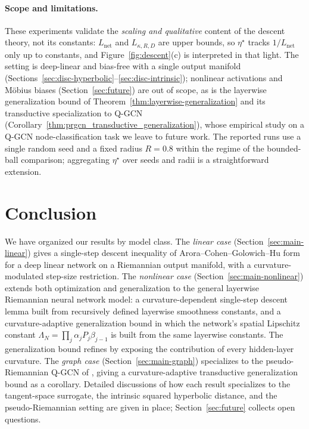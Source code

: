 \documentclass[letterpaper]{article}
\begin{document}
\paragraph{Scope and limitations.}
These experiments validate the \emph{scaling and qualitative} content of
the descent theory, not its constants: $L_{\mathrm{net}}$ and
$L_{\kappa,R,D}$ are upper bounds, so $\eta^\star$ tracks $1/L_{\mathrm{net}}$
only up to constants, and Figure~\ref{fig:descent}(c) is interpreted in that
light. The setting is deep-linear and bias-free with a single output
manifold (Sections~\ref{sec:disc-hyperbolic}--\ref{sec:disc-intrinsic});
nonlinear activations and M\"obius biases (Section~\ref{sec:future})
are out of scope, as is the layerwise generalization bound of
Theorem~\ref{thm:layerwise-generalization} and its transductive
specialization to Q-GCN
(Corollary~\ref{thm:prgcn_transductive_generalization}), whose empirical
study on a Q-GCN node-classification task we leave to future work.
The reported runs use a single random seed and a fixed radius $R=0.8$
within the regime of the bounded-ball comparison; aggregating $\eta^\star$
over seeds and radii is a straightforward extension.

\section{Conclusion}
\label{sec:conclusion}

We have organized our results by model class. The \emph{linear case}
(Section~\ref{sec:main-linear}) gives a single-step descent inequality of
Arora--Cohen--Golowich--Hu form for a deep linear network on a Riemannian
output manifold, with a curvature-modulated step-size restriction. The
\emph{nonlinear case} (Section~\ref{sec:main-nonlinear}) extends both
optimization and generalization to the general layerwise Riemannian
neural network model: a curvature-dependent single-step descent lemma
built from recursively defined layerwise smoothness constants, and a
curvature-adaptive generalization bound in which the network's spatial
Lipschitz constant
$\Lambda_N = \prod_j \alpha_j P_j \beta_{j-1}$ is built from the same
layerwise constants. The generalization bound refines
\cite{sarkar2025learning} by exposing the contribution of every
hidden-layer curvature. The \emph{graph case} (Section~\ref{sec:main-graph})
specializes to the pseudo-Riemannian Q-GCN of \cite{xiong2022pseudo},
giving a curvature-adaptive transductive generalization bound as a
corollary. Detailed discussions of how each result specializes to the
tangent-space surrogate, the intrinsic squared hyperbolic distance, and
the pseudo-Riemannian setting are given in place;
Section~\ref{sec:future} collects open questions.
\end{document}
